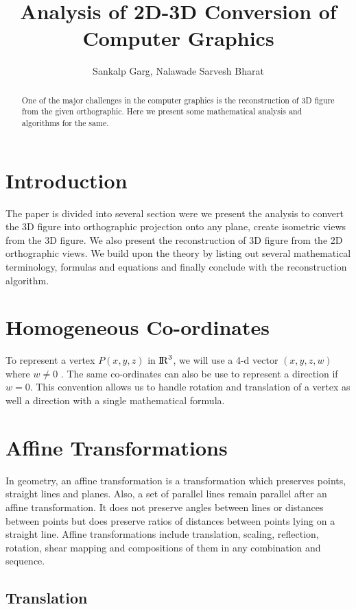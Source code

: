 \documentclass[12pt]{article}
\title{Analysis of 2D-3D Conversion of Computer Graphics}
\author{Sankalp Garg, Nalawade Sarvesh Bharat}
\date{}
\begin{document}
\maketitle

\begin{abstract}
    One of the major challenges in the computer graphics is the reconstruction of 3D figure from the given orthographic. Here we present some mathematical analysis and algorithms for the same.
\end{abstract}

\section{Introduction}
    The paper is divided into several section were we present the analysis to convert the 3D figure into orthographic projection onto any plane, create isometric views from the 3D figure. We also present the reconstruction of 3D figure from the 2D orthographic views. We build upon the theory by listing out several mathematical terminology, formulas and equations and finally conclude with the reconstruction algorithm.
	
\section{Homogeneous Co-ordinates}

	To represent a vertex $P(x,y,z)$ in ${\rm I\!R}^3$, we will use a 4-d vector $(x,y,z,w)$ where $ w \neq 0$ . The same co-ordinates can also be use to represent a direction if $w = 0$. This convention allows us to handle rotation and translation of a vertex as well a direction with a single mathematical formula.

\section{Affine Transformations}

In geometry, an affine transformation is a transformation which preserves points, straight lines and planes. Also, a set of parallel lines remain parallel after an affine transformation. It does not preserve angles between lines or distances between points but does preserve ratios of distances between points lying on a straight line. Affine transformations include translation, scaling, reflection, rotation, shear mapping and compositions of them in any combination and sequence.

\subsection{Translation}
\end{document}
